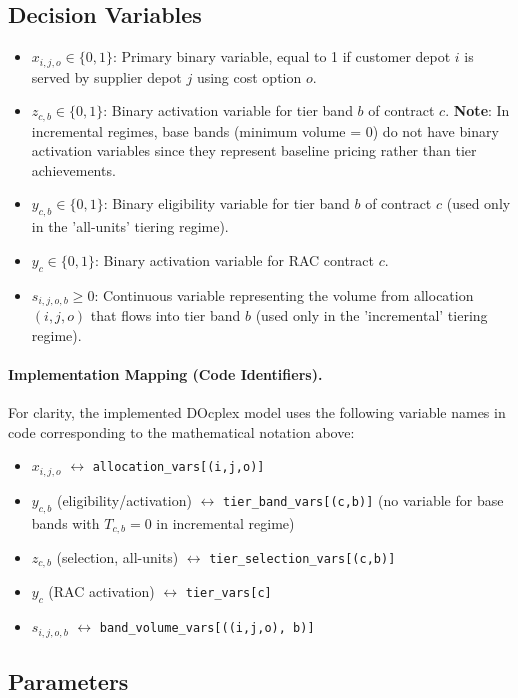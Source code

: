 \subsection{Decision Variables}
\begin{itemize}
    \item $x_{i,j,o} \in \{0,1\}$: Primary binary variable, equal to 1 if customer depot $i$ is served by supplier depot $j$ using cost option $o$.
    \item $z_{c,b} \in \{0,1\}$: Binary activation variable for tier band $b$ of contract $c$. \textbf{Note}: In incremental regimes, base bands (minimum volume = 0) do not have binary activation variables since they represent baseline pricing rather than tier achievements.
    \item $y_{c,b} \in \{0,1\}$: Binary eligibility variable for tier band $b$ of contract $c$ (used only in the 'all-units' tiering regime).
    \item $y_{c} \in \{0,1\}$: Binary activation variable for RAC contract $c$.
    \item $s_{i,j,o,b} \ge 0$: Continuous variable representing the volume from allocation $(i,j,o)$ that flows into tier band $b$ (used only in the 'incremental' tiering regime).
\end{itemize}

\paragraph{Implementation Mapping (Code Identifiers).}
For clarity, the implemented DOcplex model uses the following variable names in code corresponding to the mathematical notation above:
\begin{itemize}
    \item $x_{i,j,o}$ \;$\leftrightarrow$\; \texttt{allocation\_vars[(i,j,o)]}
    \item $y_{c,b}$ (eligibility/activation) \;$\leftrightarrow$\; \texttt{tier\_band\_vars[(c,b)]} \;(no variable for base bands with $T_{c,b}=0$ in incremental regime)
    \item $z_{c,b}$ (selection, all-units) \;$\leftrightarrow$\; \texttt{tier\_selection\_vars[(c,b)]}
    \item $y_c$ (RAC activation) \;$\leftrightarrow$\; \texttt{tier\_vars[c]}
    \item $s_{i,j,o,b}$ \;$\leftrightarrow$\; \texttt{band\_volume\_vars[((i,j,o), b)]}
\end{itemize}

\subsection{Parameters}
